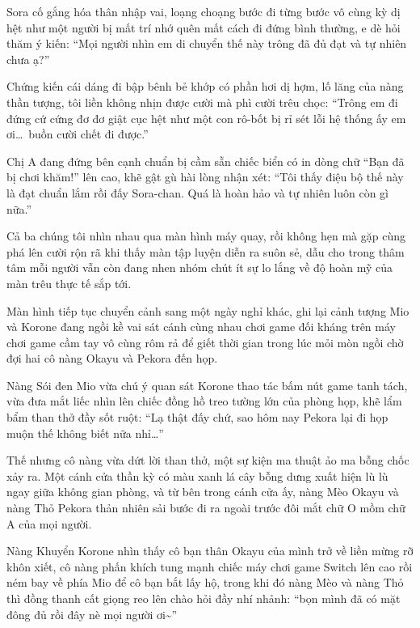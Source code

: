 \documentclass[../main.tex]{subfiles}
\begin{document}
Sora cố gắng hóa thân nhập vai, loạng choạng bước đi từng bước vô cùng kỳ dị hệt như một người bị mất trí nhớ quên mất cách đi đứng bình thường, e dè hỏi thăm ý kiến: ``Mọi người nhìn em di chuyển thế này trông đã đủ đạt và tự nhiên chưa ạ?''

Chứng kiến cái dáng đi bập bênh bẻ khớp có phần hơi dị hợm, lố lăng của nàng thần tượng, tôi liền không nhịn được cười mà phì cười trêu chọc: ``Trông em đi đứng cứ cứng đơ đơ giật cục hệt như một con rô-bốt bị rỉ sét lỗi hệ thống ấy em ơi\dots\ buồn cười chết đi được.''

Chị A đang đứng bên cạnh chuẩn bị cầm sẵn chiếc biển có in dòng chữ ``Bạn đã bị chơi khăm!'' lên cao, khẽ gật gù hài lòng nhận xét: ``Tôi thấy điệu bộ thế này là đạt chuẩn lắm rồi đấy Sora-chan. Quá là hoàn hảo và tự nhiên luôn còn gì nữa.''

Cả ba chúng tôi nhìn nhau qua màn hình máy quay, rồi không hẹn mà gặp cùng phá lên cười rộn rã khi thấy màn tập luyện diễn ra suôn sẻ, dẫu cho trong thâm tâm mỗi người vẫn còn đang nhen nhóm chút ít sự lo lắng về độ hoàn mỹ của màn trêu thực tế sắp tới.


\il


Màn hình tiếp tục chuyển cảnh sang một ngày nghỉ khác, ghi lại cảnh tượng Mio và Korone đang ngồi kề vai sát cánh cùng nhau chơi game đối kháng trên máy chơi game cầm tay vô cùng rôm rả để giết thời gian trong lúc mỏi mòn ngồi chờ đợi hai cô nàng Okayu và Pekora đến họp.

Nàng Sói đen Mio vừa chú ý quan sát Korone thao tác bấm nút game tanh tách, vừa đưa mắt liếc nhìn lên chiếc đồng hồ treo tường lớn của phòng họp, khẽ lẩm bẩm than thở đầy sốt ruột: ``Lạ thật đấy chứ, sao hôm nay Pekora lại đi họp muộn thế không biết nữa nhỉ\dots''

Thế nhưng cô nàng vừa dứt lời than thở, một sự kiện ma thuật ảo ma bỗng chốc xảy ra. Một cánh cửa thần kỳ có màu xanh lá cây bỗng dưng xuất hiện lù lù ngay giữa không gian phòng, và từ bên trong cánh cửa ấy, nàng Mèo Okayu và nàng Thỏ Pekora thản nhiên sải bước đi ra ngoài trước đôi mắt chữ O mồm chữ A của mọi người.

Nàng Khuyển Korone nhìn thấy cô bạn thân Okayu của mình trở về liền mừng rỡ khôn xiết, cô nàng phấn khích tung mạnh chiếc máy chơi game Switch lên cao rồi ném bay về phía Mio để cô bạn bắt lấy hộ, trong khi đó nàng Mèo và nàng Thỏ thì đồng thanh cất giọng reo lên chào hỏi đầy nhí nhảnh: ``bọn mình đã có mặt đông đủ rồi đây nè mọi người ơi\~{}''
\end{document}
